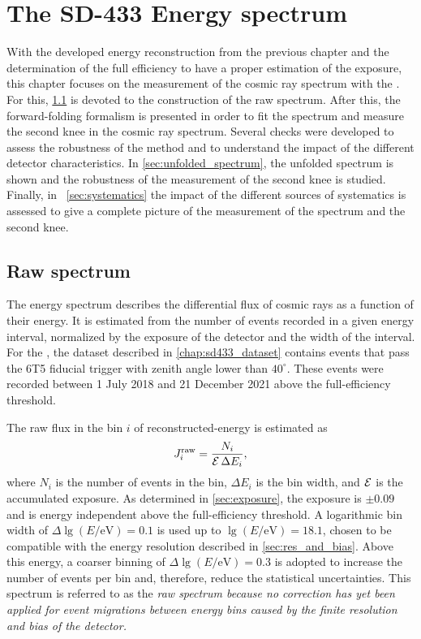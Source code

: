 \documentclass[main.tex]{subfiles}
\begin{document}
\chapter{The SD-433 Energy spectrum}
\label{chapter:SD433_Spectrum}
\label{chap:sdpectrum}

With the developed energy reconstruction from the previous chapter and the determination of the full efficiency to have a proper estimation of the exposure, this chapter focuses on the measurement of the cosmic ray spectrum with the .
For this, \cref{sec:raw_spectrum} is devoted to the construction of the raw spectrum. 
After this, the forward-folding formalism is presented in order to fit the spectrum and measure the second knee in the cosmic ray spectrum.
Several checks were developed to assess the robustness of the method and to understand the impact of the different detector characteristics.
In \cref{sec:unfolded_spectrum}, the unfolded spectrum is shown and the robustness of the measurement of the second knee is studied.
Finally, in ~\cref{sec:systematics} the impact of the different sources of systematics is assessed to give a complete picture of the measurement of the spectrum and the second knee.

\section{Raw spectrum}
\label{sec:raw_spectrum}
The energy spectrum describes the differential flux of cosmic rays as a function of their energy.
It is estimated from the number of events recorded in a given energy interval, normalized by the exposure of the detector and the width of the interval.
For the , the dataset described in \cref{chap:sd433_dataset} contains \SDFourThreeThreeNEvents events that pass the 6T5 fiducial trigger with zenith angle lower than $40^\circ$.
These events were recorded between 1 July 2018 and 21 December 2021 above the full-efficiency threshold.

The raw flux in the bin $i$ of reconstructed-energy is estimated as
\begin{align}
    J_i^{\mathrm{raw}}
    =
    \frac{N_i}{\mathcal{E}\,\Delta E_i},
    \label{eq:raw_flux}
\end{align}
where $N_i$ is the number of events in the bin, $\Delta E_i$ is the bin width, and $\mathcal{E}$ is the accumulated exposure.
As determined in \cref{sec:exposure}, the exposure is \SDFourThreeThreeExposure$\pm0.09$ and is energy independent above the full-efficiency threshold.
A logarithmic bin width of $\Delta\lg(E/\mathrm{eV})=0.1$ is used up to $\lg(E/\mathrm{eV})=18.1$, chosen to be compatible with the energy resolution described in \cref{sec:res_and_bias}.
Above this energy, a coarser binning of $\Delta\lg(E/\mathrm{eV})=0.3$ is adopted to increase the number of events per bin and, therefore, reduce the statistical uncertainties.
This spectrum is referred to as the \it{raw spectrum} because no correction has yet been applied for event migrations between energy bins caused by the finite resolution and bias of the detector.
\end{document}
